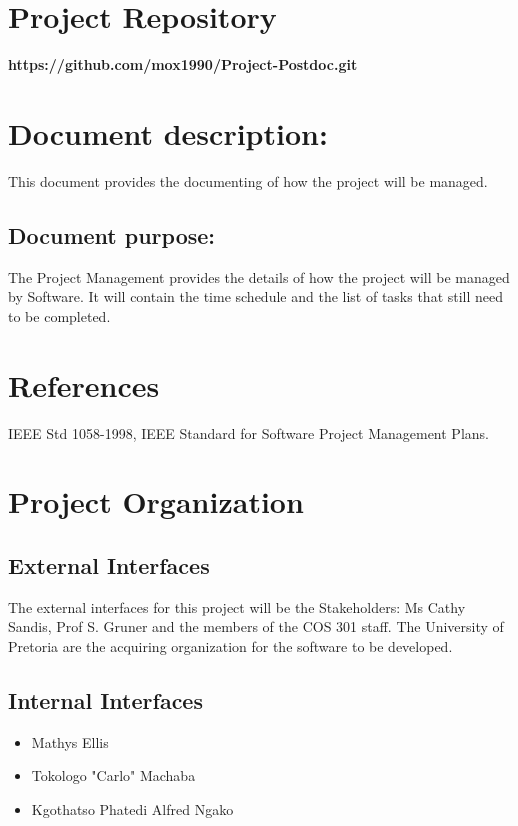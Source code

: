\documentclass[12pt]{article}
\newcommand{\repo}{https://github.com/mox1990/Project-Postdoc.git}
\begin{document}
\listoffigures
\newpage
\section{Project Repository}
\textbf{\repo}
\newpage
\section{Document description:}
This document provides the documenting of how the project will be managed.

\subsection{Document purpose:}
\vspace{0.2in}
The Project Management provides the details of how the project will be managed by Software. It will contain the time schedule and the list of tasks that still need to be completed.

\section{References}
IEEE Std 1058-1998, IEEE Standard for Software Project Management Plans.

\vspace{0.2in}

\newpage
\section{Project Organization}

\subsection{External Interfaces}
The external interfaces for this project will be the Stakeholders: Ms Cathy Sandis, Prof S. Gruner and the members of the COS 301 staff. The University of Pretoria are the acquiring organization for the software to be developed.

\subsection{Internal Interfaces}
\begin{itemize}
\item Mathys Ellis
\item Tokologo "Carlo" Machaba
\item Kgothatso Phatedi Alfred Ngako
\end{itemize}
\end{document}
